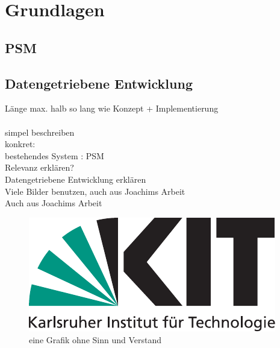 \chapter{Grundlagen}\label{ch:grundlagen}

\section{PSM}
\section{Datengetriebene Entwicklung}

Länge max. halb so lang wie Konzept + Implementierung\\
\\
simpel beschreiben\\
konkret:\\
bestehendes System : PSM\\
Relevanz erklären?\\
Datengetriebene Entwicklung erklären \\
Viele Bilder benutzen, auch aus Joachims Arbeit\\
Auch aus Joachims Arbeit \\

\begin{figure}
	\centering
	\includegraphics{bilder/Kitlogo_de_rgb.pdf}
	\caption{eine Grafik ohne Sinn und Verstand}
	\label{img:grafik-dummy}
\end{figure}

\begin{deprecated}
\cite{gehrung14}


\end{deprecated}
